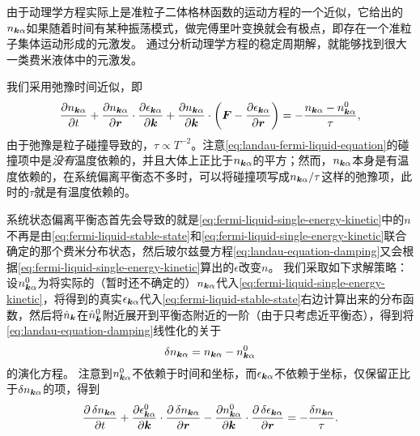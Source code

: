 由于动理学方程实际上是准粒子二体格林函数的运动方程的一个近似，它给出的$n_{\vb*{k} \alpha}$如果随着时间有某种振荡模式，做完傅里叶变换就会有极点，即存在一个准粒子集体运动形成的元激发。
通过分析动理学方程的稳定周期解，就能够找到很大一类费米液体中的元激发。

我们采用弛豫时间近似，即
\begin{equation}
    \pdv{n_{\vb*{k} \alpha}}{t} + \pdv{n_{\vb*{k} \alpha}}{\vb*{r}} \cdot \pdv{\epsilon_{\vb*{k} \alpha}}{\vb*{k}} + \pdv{n_{\vb*{k} \alpha}}{\vb*{k}} \cdot \left( \vb*{F} - \pdv{\epsilon_{\vb*{k} \alpha}}{\vb*{r}} \right) = - \frac{n_{\vb*{k} \alpha} - n_{\vb*{k} \alpha}^0}{\tau},
    \label{eq:landau-equation-damping}
\end{equation}
由于弛豫是粒子碰撞导致的，$\tau \propto T^{-2}$。注意\eqref{eq:landau-fermi-liquid-equation}的碰撞项中是\emph{没有}温度依赖的，并且大体上正比于$n_{\vb*{k} \alpha}$的平方；然而，$n_{\vb*{k} \alpha}$本身是有温度依赖的，在系统偏离平衡态不多时，可以将碰撞项写成$n_{\vb*{k} \alpha} / \tau$这样的弛豫项，此时的$\tau$就是有温度依赖的。

系统状态偏离平衡态首先会导致的就是\eqref{eq:fermi-liquid-single-energy-kinetic}中的$n$不再是由\eqref{eq:fermi-liquid-stable-state}和\eqref{eq:fermi-liquid-single-energy-kinetic}联合确定的那个费米分布状态，然后玻尔兹曼方程\eqref{eq:landau-equation-damping}又会根据\eqref{eq:fermi-liquid-single-energy-kinetic}算出的$\epsilon$改变$n$。
我们采取如下求解策略：设${n}^0_{\vb*{k} \alpha}$为将实际的（暂时还不确定的）${n}_{\vb*{k} \alpha}$代入\eqref{eq:fermi-liquid-single-energy-kinetic}，将得到的真实$\epsilon_{\vb*{k} \alpha}$代入\eqref{eq:fermi-liquid-stable-state}右边计算出来的分布函数，然后将$\hat{n}_{\vb*{k}}$在$\hat{n}^0_{\vb*{k}}$附近展开到平衡态附近的一阶（由于只考虑近平衡态），得到将\eqref{eq:landau-equation-damping}线性化的关于
\begin{equation}
    \var{n_{\vb*{k} \alpha}} = n_{\vb*{k} \alpha} - n_{\vb*{k} \alpha}^0
\end{equation}
的演化方程。
注意到$n_{\vb*{k} \alpha}^0$不依赖于时间和坐标，而$\epsilon_{\vb*{k} \alpha}$不依赖于坐标，仅保留正比于$\var{n}_{\vb*{k} \alpha}$的项，得到
\begin{equation}
    \pdv{\var{n}_{\vb*{k} \alpha}}{t} + \pdv{\epsilon^0_{\vb*{k} \alpha}}{\vb*{k}} \cdot \pdv{\var{n_{\vb*{k} \alpha}}}{\vb*{r}} - \pdv{n^0_{\vb*{k} \alpha}}{\vb*{k}} \cdot \pdv{\var{\epsilon_{\vb*{k} \alpha}}}{\vb*{r}} = - \frac{\var{n}_{\vb*{k} \alpha}}{\tau}.
    \label{eq:delta-from-stable-fermi-liquid}
\end{equation}

